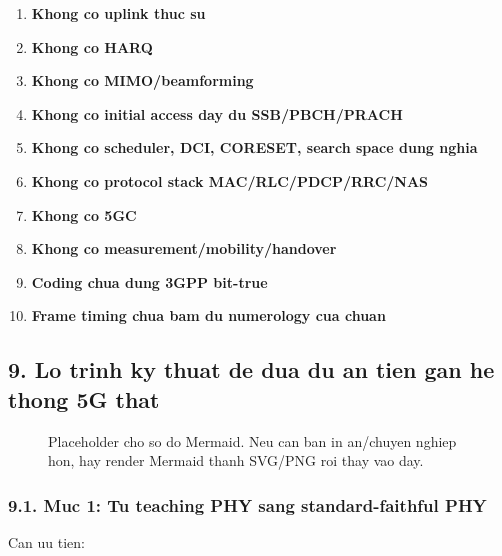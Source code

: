 \documentclass[
  vietnamese,
  a4paper,
  11pt]{article}
\providecommand{\tightlist}{%
  \setlength{\itemsep}{0pt}\setlength{\parskip}{0pt}}
\begin{document}
\begin{enumerate}
\def\labelenumi{\arabic{enumi}.}
\tightlist
\item
  \textbf{Khong co uplink thuc su}
\item
  \textbf{Khong co HARQ}
\item
  \textbf{Khong co MIMO/beamforming}
\item
  \textbf{Khong co initial access day du SSB/PBCH/PRACH}
\item
  \textbf{Khong co scheduler, DCI, CORESET, search space dung nghia}
\item
  \textbf{Khong co protocol stack MAC/RLC/PDCP/RRC/NAS}
\item
  \textbf{Khong co 5GC}
\item
  \textbf{Khong co measurement/mobility/handover}
\item
  \textbf{Coding chua dung 3GPP bit-true}
\item
  \textbf{Frame timing chua bam du numerology cua chuan}
\end{enumerate}

\subsection{9. Lo trinh ky thuat de dua du an tien gan he thong 5G
that}\label{lo-trinh-ky-thuat-de-dua-du-an-tien-gan-he-thong-5g-that}

\begin{figure}[H]
\centering
{}
\caption{Placeholder cho so do Mermaid. Neu can ban in an/chuyen nghiep hon, hay render Mermaid thanh SVG/PNG roi thay vao day.}
\end{figure}

\subsubsection{9.1. Muc 1: Tu teaching PHY sang standard-faithful
PHY}\label{muc-1-tu-teaching-phy-sang-standard-faithful-phy}

Can uu tien:
\end{document}
